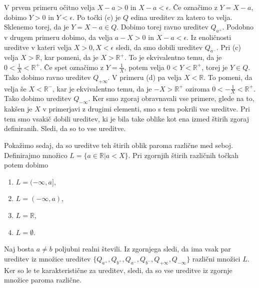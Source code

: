 \documentclass[a4paper, 12pt]{article}
\newcommand{\R}{\mathbb{R}}
\begin{document}
\begin{enumerate}
V prvem primeru očitno velja $X-a > 0$ in $X-a < \epsilon$. Če označimo z $Y=X-a$, dobimo $Y>0$ in $Y<\epsilon$. Po točki (c) je $Q$ edina ureditev za katero to velja. Sklenemo torej, da je $Y = X-a\in Q$. Dobimo torej ravno ureditev $Q_{a^+}$. Podobno v drugem primeru dobimo, da velja $a-X>0$ in $X-a < \epsilon$. Iz enoličnosti ureditve v kateri velja $X>0, X<\epsilon$ sledi, da smo dobili ureditev $Q_{a^-}$. Pri (c) velja $X>\R$, kar pomeni, da je $X>\R^+$. To je ekvivalentno temu, da je $0 < \frac{1}{X} < \R^+$. Če spet označimo z $Y=\frac{1}{X}$, potem velja $0 < Y < \R^+$, torej je $Y\in Q$. Tako dobimo ravno ureditev $Q_{+\infty}$. V primeru (d) pa velja $X<\R$. To pomeni, da velja še $X< \R^-$, kar je ekvivalentno temu, da je $-X > \R^+$ oziroma $0 < -\frac{1}{X} < \R^+$. Tako dobimo ureditev $Q_{-\infty}$. Ker smo zgoraj obravnavali vse primere, glede na to, kakšen je $X$ v primerjavi z drugimi elementi, smo s tem pokrili vse ureditve. Pri tem smo vsakič dobili ureditev, ki je bila take oblike kot ena izmed štirih zgoraj definiranih. Sledi, da so to vse ureditve.

Pokažimo sedaj, da so ureditve teh štirih oblik paroma različne med seboj. Definirajmo množico $L=\{ a\in \R| a < X\}$. Pri zgornjih štirih različnih točkah potem dobimo
\begin{enumerate}
\item $L= (-\infty, a]$,
\item $L = (-\infty,a)$,
\item $L=\R$,
\item $L=\emptyset$.
\end{enumerate}
Naj bosta $a\neq b$ poljubni realni števili. Iz zgornjega sledi, da ima vsak par ureditev iz množice ureditev $\{Q_{a^+}, Q_{b^+}, Q_{a^-}, Q_{b^-},Q_{+\infty},Q_{-\infty}\}$ različni množici $L$. Ker so le te karakteristične za ureditev, sledi, da so vse ureditve iz zgornje množice paroma različne.



\end{enumerate}
\end{document}
